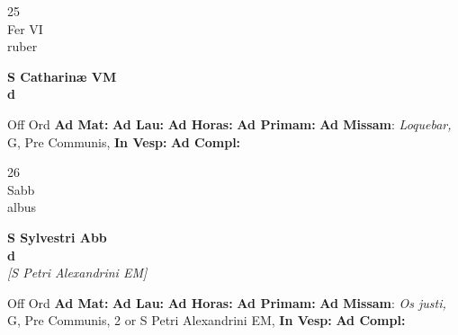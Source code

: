 \documentclass[10pt, openany]{book}
\begin{document}
    \begin{center}
        \begin{minipage}{3.5in}
            \vspace{2em}
            \begin{minipage}{0.5in}
                {\Huge 25} \\
                {\normalsize Fer VI} \\
                {\normalsize ruber}
            \end{minipage}
            \begin{minipage}{3.0in}
                \textbf{ \large S Catharinæ VM \\
                \textnormal{\normalsize d}} \\ 
            \end{minipage}
            \begin{justify}Off Ord
                \textbf{Ad Mat: }
                \textbf{Ad Lau: }
                \textbf{Ad Horas: }
                \textbf{Ad Primam: }\textbf{Ad Missam}: \textit{Loquebar,} G, Pre Communis,  
                \textbf{In Vesp: }
                \textbf{Ad Compl: }
            \end{justify}
        \end{minipage}
    \end{center}

    \begin{center}
        \begin{minipage}{3.5in}
            \vspace{2em}
            \begin{minipage}{0.5in}
                {\Huge 26} \\
                {\normalsize Sabb} \\
                {\normalsize albus}
            \end{minipage}
            \begin{minipage}{3.0in}
                \textbf{ \large S Sylvestri Abb \\
                \textnormal{\normalsize d}} \\ \textit{[S Petri Alexandrini EM]} \\ 
            \end{minipage}
            \begin{justify}Off Ord
                \textbf{Ad Mat: }
                \textbf{Ad Lau: }
                \textbf{Ad Horas: }
                \textbf{Ad Primam: }\textbf{Ad Missam}: \textit{Os justi,} G, Pre Communis, 2 or S Petri Alexandrini EM,  
                \textbf{In Vesp: }
                \textbf{Ad Compl: }
            \end{justify}
        \end{minipage}
    \end{center}
\end{document}
